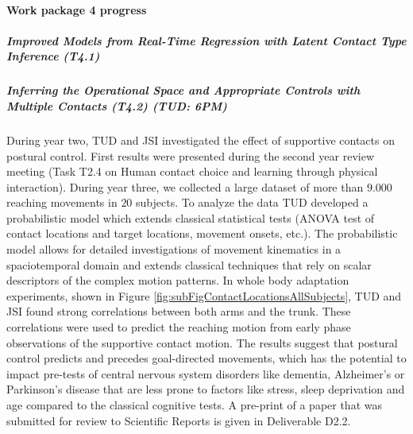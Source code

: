 

\paragraph{Work package 4 progress}

\subparagraph{Improved Models from Real-Time Regression with Latent Contact Type Inference (T4.1)}



\subparagraph{Inferring the Operational Space and Appropriate Controls with Multiple Contacts (T4.2) (TUD: 6PM)}%


During year two, TUD and JSI investigated the effect of supportive contacts on 
postural control. First results were presented during the second year review 
meeting (Task T2.4 on Human contact choice and learning through physical 
interaction). During year three, we collected a large dataset of more than 
$9.000$ reaching movements in $20$ subjects. To analyze the data TUD developed a 
probabilistic model which extends classical statistical tests (ANOVA test of 
contact locations and target locations, movement onsets, etc.). The 
probabilistic model allows for detailed investigations of movement kinematics in 
a spaciotemporal domain and extends classical techniques that rely on scalar 
descriptors of the complex motion patterns. In whole body adaptation 
experiments, shown in Figure \ref{fig:subFigContactLocationsAllSubjects}, TUD 
and JSI found strong correlations between both arms and the trunk. These 
correlations were used to predict the reaching motion from early phase 
observations of the supportive contact motion. The results suggest that postural 
control predicts and precedes goal-directed movements, which has the potential 
to impact pre-tests of central nervous system disorders like dementia, 
Alzheimer's or Parkinson's disease that are less prone to factors like stress, 
sleep deprivation and age compared to the classical cognitive tests. A pre-print 
of a paper that was submitted for review to Scientific Reports is given in 
Deliverable D2.2.

